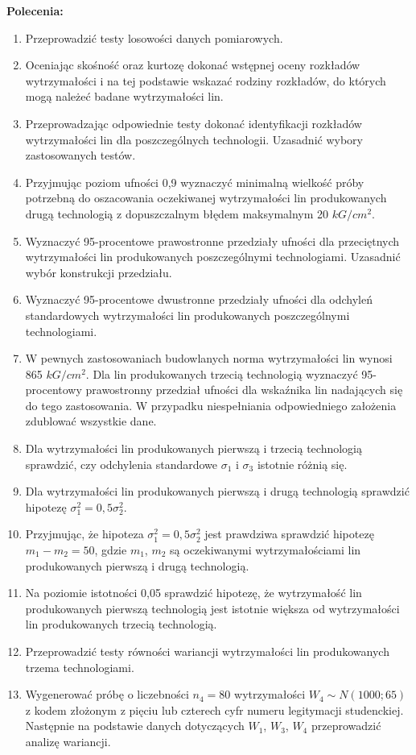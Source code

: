 \documentclass{article}
\begin{document}
\textbf{Polecenia:}
\begin{enumerate}[label = \alph*)]
\item Przeprowadzić testy losowości danych pomiarowych.
\item Oceniając skośność oraz kurtozę dokonać wstępnej oceny rozkładów wytrzymałości
i na tej podstawie wskazać rodziny rozkładów, do których mogą należeć badane
wytrzymałości lin.
\item Przeprowadzając odpowiednie testy dokonać identyfikacji rozkładów wytrzymałości
lin dla poszczególnych technologii. Uzasadnić wybory zastosowanych testów.
\item Przyjmując poziom ufności 0,9 wyznaczyć minimalną wielkość próby potrzebną do
oszacowania oczekiwanej wytrzymałości lin produkowanych drugą technologią
z dopuszczalnym błędem maksymalnym 20 $kG/cm^2$.
\item Wyznaczyć 95-procentowe prawostronne przedziały ufności dla przeciętnych
wytrzymałości lin produkowanych poszczególnymi technologiami. Uzasadnić wybór
konstrukcji przedziału.
\item Wyznaczyć 95-procentowe dwustronne przedziały ufności dla odchyleń standardowych
wytrzymałości lin produkowanych poszczególnymi technologiami.
\item W pewnych zastosowaniach budowlanych norma wytrzymałości lin wynosi 865 $kG/cm^2$. Dla lin produkowanych trzecią technologią wyznaczyć 95-procentowy
prawostronny przedział ufności dla wskaźnika lin nadających się do tego zastosowania.
W przypadku niespełniania odpowiedniego założenia zdublować wszystkie dane.
\item Dla wytrzymałości lin produkowanych pierwszą i trzecią technologią sprawdzić, czy
odchylenia standardowe $\sigma_1$ i $\sigma_3$ istotnie różnią się.
\item Dla wytrzymałości lin produkowanych pierwszą i drugą technologią sprawdzić hipotezę $\sigma_1^2 = 0,5 \sigma_2^2$.
\item Przyjmując, że hipoteza $\sigma_1^2 = 0,5 \sigma_2^2$
jest prawdziwa sprawdzić hipotezę $m_1 - m_2 = 50$, gdzie $m_1$, $m_2$ są oczekiwanymi wytrzymałościami lin produkowanych pierwszą
i drugą technologią.
\item Na poziomie istotności 0,05 sprawdzić hipotezę, że wytrzymałość lin produkowanych
pierwszą technologią jest istotnie większa od wytrzymałości lin produkowanych trzecią
technologią.
\item Przeprowadzić testy równości wariancji wytrzymałości lin produkowanych trzema
technologiami.
\item Wygenerować próbę o liczebności $n_4 = 80$ wytrzymałości $W_4 \sim N(1000; 65)$ z kodem
złożonym z pięciu lub czterech cyfr numeru legitymacji studenckiej. Następnie na
podstawie danych dotyczących $W_1$, $W_3$, $W_4$ przeprowadzić analizę wariancji. 
\end{enumerate}
\end{document}

